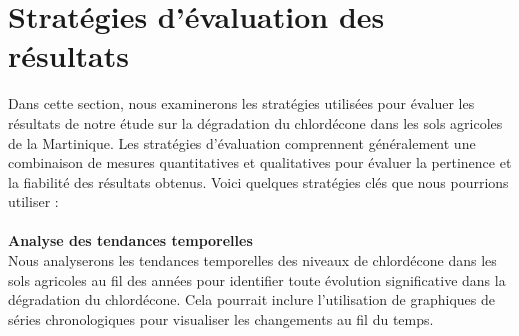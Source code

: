 \documentclass{report}
\begin{document}
\section*{Stratégies d'évaluation des résultats}

Dans cette section, nous examinerons les stratégies utilisées pour évaluer les résultats de notre étude sur la dégradation du chlordécone dans les sols agricoles de la Martinique. Les stratégies d'évaluation comprennent généralement une combinaison de mesures quantitatives et qualitatives pour évaluer la pertinence et la fiabilité des résultats obtenus. Voici quelques stratégies clés que nous pourrions utiliser :\\\\
\large\textbf{Analyse des tendances temporelles} \\
Nous analyserons les tendances temporelles des niveaux de chlordécone dans les sols agricoles au fil des années pour identifier toute évolution significative dans la dégradation du chlordécone. Cela pourrait inclure l'utilisation de graphiques de séries chronologiques pour visualiser les changements au fil du temps.\\
\end{document}

